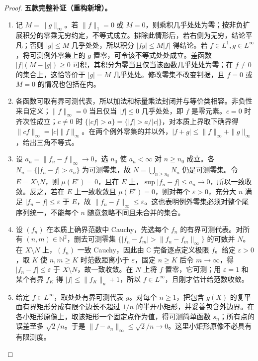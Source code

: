 \documentclass[../../main.tex]{subfiles}
\begin{document}
\begin{proof}\label{proof:ch06-linfty-properties-complete}
\textbf{五款完整补证（重构新增）。}
\begin{enumerate}
\item 记 $M=\|g\|_\infty$。若 $\|f\|_1=0$ 或 $M=0$，则乘积几乎处处为零；按非负扩展积分的零乘无穷约定，不等式成立。排除此情形后，若右侧为无穷，结论平凡；否则 $|g|\leqslant M$ 几乎处处，所以积分 $|fg|\leqslant M|f|$ 得结论。若 $f\in L^1,g\in L^\infty$，将可测例外零集上的 $g$ 置零，可令该不等式处处成立。差函数 $|f|(M-|g|)\geqslant0$ 可积，其积分为零当且仅当该函数几乎处处为零；在 $f\ne0$ 的集合上，这恰等价于 $|g|=M$ 几乎处处。修改零集不改变判据，且 $f=0$ 或 $M=0$ 的情况也包括在内。
\item 各函数可取有界可测代表，所以加法和标量乘法封闭并与等价类相容。非负性来自定义；$\|f\|_\infty=0$ 当且仅当 $|f|\leqslant0$ 几乎处处，即 $f$ 是零元素。$c=0$ 时齐次性成立；$c\ne0$ 时 $\{|cf|>a\}=\{|f|>a/|c|\}$，对本质上界取下确界得 $\|cf\|_\infty=|c|\|f\|_\infty$。在两个例外零集的并以外，$|f+g|\leqslant\|f\|_\infty+\|g\|_\infty$，给出三角不等式。
\item 设 $a_n=\|f_n-f\|_\infty\to0$，选 $n_0$ 使 $a_n<\infty$ 对 $n\geqslant n_0$ 成立。各 $N_n=\{|f_n-f|>a_n\}$ 为可测零集，故 $N=\bigcup_{n\geqslant n_0}N_n$ 仍是可测零集。令 $E=X\setminus N$，则 $\mu(E^c)=0$，且在 $E$ 上，$\sup|f_n-f|\leqslant a_n\to0$，所以一致收敛。反之，若在 $E$ 上一致收敛且 $\mu(E^c)=0$，则对每个 $\varepsilon>0$，充分大 $n$ 满足 $|f_n-f|\leqslant\varepsilon$ 于 $E$，故 $\|f_n-f\|_\infty\leqslant\varepsilon$。这也表明例外零集必须对整个尾序列统一，不能每个 $n$ 随意忽略不同且未合并的集合。
\item 设 $(f_n)$ 在本质上确界范数中 Cauchy，先选每个 $f_n$ 的有界可测代表。对所有 $(n,m)\in\mathbb N^2$，删去可测零集 $\{|f_n-f_m|>\|f_n-f_m\|_\infty\}$ 的可数并 $N$。在 $X\setminus N$ 上，$(f_n)$ 一致 Cauchy，因此由 $\mathbb C$ 完备逐点定义极限 $f$。给定 $\varepsilon>0$，取 $K$ 使 $n,m\geqslant K$ 时范数距离小于 $\varepsilon$，固定 $n\geqslant K$ 后令 $m\to\infty$，得 $|f_n-f|\leqslant\varepsilon$ 于 $X\setminus N$，故一致收敛。在 $N$ 上将 $f$ 置零，它可测；用 $\varepsilon=1$ 和某个有界 $f_K$ 得 $|f|\leqslant\|f_K\|_u+1$，所以 $f\in L^\infty$，且刚才估计给范数收敛。
\item 给定 $f\in L^\infty$，取处处有界可测代表 $g$。对每个 $n\geqslant1$，把包含 $g(X)$ 的复平面有界矩形分成有限个边长不超过 $1/n$ 的半开小矩形，并妥善包含外边界。在各小矩形原像上，取该矩形一个固定点作为值，得可测简单函数 $s_n$；所有点的误差至多 $\sqrt2/n$。于是 $\|f-s_n\|_\infty\leqslant\sqrt2/n\to0$。这里小矩形原像不必具有有限测度。
\end{enumerate}
\end{proof}
\end{document}
